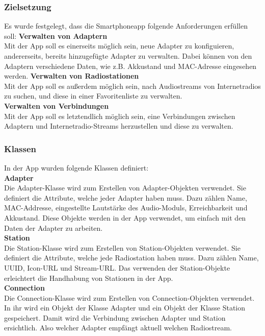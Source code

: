 \documentclass[]{article}
\begin{document}
\subsubsection{Zielsetzung}
Es wurde festgelegt, dass die Smartphoneapp folgende Anforderungen erfüllen soll:
\vspace{4mm}\newline 
\textbf{Verwalten von Adaptern}  \\
Mit der App soll es einerseits möglich sein, neue Adapter zu konfiguieren, andererseits, bereits hinzugefügte Adapter zu verwalten. Dabei können von den Adaptern verschiedene Daten, wie z.B. Akkustand und MAC-Adresse eingesehen werden.
\vspace{4mm}\newline
\textbf{Verwalten von Radiostationen} \\
Mit der App soll es außerdem möglich sein, nach Audiostreams von Internetradios zu suchen, und diese in einer Favoritenliste zu verwalten. \newline \\
\textbf{Verwalten von Verbindungen} \\
Mit der App soll es letztendlich möglich sein, eine Verbindungen zwischen Adaptern und Internetradio-Streams herzustellen und diese zu verwalten.
\subsubsection{Klassen}
In der App wurden folgende Klassen definiert: \newline \\
\textbf{Adapter} \\
Die Adapter-Klasse wird zum Erstellen von Adapter-Objekten verwendet. Sie definiert die Attribute, welche jeder Adapter haben muss. Dazu zählen Name, MAC-Addresse, eingestellte Lautstärke des Audio-Moduls, Erreichbarkeit und Akkustand. Diese Objekte werden in der App verwendet, um einfach mit den Daten der Adapter zu arbeiten. \newline \\
\textbf{Station} \\
Die Station-Klasse wird zum Erstellen von Station-Objekten verwendet. Sie definiert die Attribute, welche jede Radiostation haben muss. Dazu zählen Name, UUID, Icon-URL und Stream-URL. Das verwenden der Station-Objekte erleichtert die Handhabung von Stationen in der App. \newline \\
\textbf{Connection} \\
Die Connection-Klasse wird zum Erstellen von Connection-Objekten verwendet. In ihr wird ein Objekt der Klasse Adapter und ein Objekt der Klasse Station gespeichert. Damit wird die Verbindung zwischen Adapter und Station ersichtlich. Also welcher Adapter empfängt aktuell welchen Radiostream. \newline \\
\end{document}
